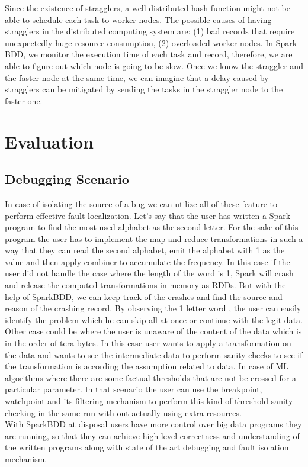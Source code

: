 \documentclass{acm_proc_article-sp}
\begin{document}
Since the existence of stragglers, a well-distributed hash function might not be able to schedule each task to worker nodes. The possible causes of having stragglers in the distributed computing system are: (1) bad records that require unexpectedly huge resource consumption, (2) overloaded worker nodes. In Spark-BDD, we monitor the execution time of each task and record, therefore, we are able to figure out which node is going to be slow. Once we know the straggler and the faster node at the same time, we can imagine that a delay caused by stragglers can be mitigated by sending the tasks in the straggler node to the faster one. 

\section{Evaluation}
\subsection{Debugging Scenario}
In case of isolating the source of a bug we can utilize all of these feature to perform effective fault localization. Let's say that the user has written a Spark program to find the most used alphabet as the second letter. For the sake of this program the user has to implement the map and reduce transformations in such a way that they can read the second alphabet, emit the alphabet with 1 as the value and then apply combiner to accumulate the frequency. In this case if the user did not handle the case where the length of the word is 1, Spark will crash and release the computed transformations in memory as RDDs. But with the help of SparkBDD, we can keep track of the crashes and find the source and reason of the crashing record. By observing the 1 letter word , the user can easily identify the problem which he can skip all at once or continue with the legit data.\\
Other case could be where the user is unaware of the content of the data which is in the order of tera bytes. In this case user wants to apply a transformation on the data and wants to see the intermediate data to perform sanity checks to see if the transformation is according the assumption related to data. In case of ML algorithms where there are some factual thresholds that are not be crossed for a particular parameter. In that scenario the user can use the breakpoint, watchpoint and its filtering mechanism to perform this kind of threshold sanity checking in the same run with out actually using extra resources. \\
With SparkBDD at disposal users have more control over big data programs they are running, so that they can achieve high level correctness and understanding of the written programs along with state of the art debugging and fault isolation mechanism. \\
\end{document}
